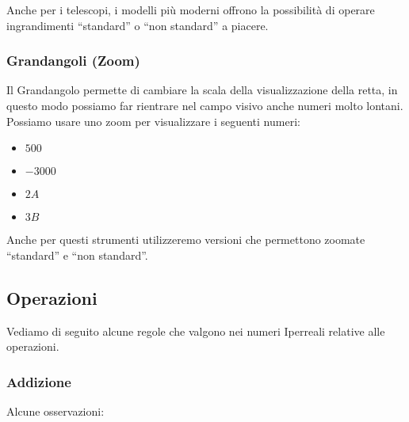 Anche per i telescopi, i modelli più moderni offrono la possibilità di operare 
ingrandimenti ``standard'' o ``non standard'' a piacere.

\subsubsection{Grandangoli (Zoom)}
\label{subsec:insnum_microscopio}

Il Grandangolo permette di cambiare la scala della visualizzazione della retta, 
in questo modo possiamo far rientrare nel campo visivo anche numeri molto 
lontani.
Possiamo usare uno zoom per visualizzare i seguenti numeri:

\begin{multicols}{4}
\begin{itemize}
 \item $500$
 \item $-3000$
 \item $2A$
 \item $3B$
\end{itemize}
\end{multicols}

Anche per questi strumenti utilizzeremo versioni che permettono zoomate 
``standard'' e ``non standard''.

\subsection{Operazioni}
\label{subsec:insnum_operazioni}

Vediamo di seguito alcune regole che valgono nei numeri Iperreali relative alle 
operazioni.

\subsubsection{Addizione}
\label{subsec:insnum_addizione}

Alcune osservazioni:

